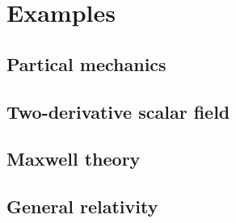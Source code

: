 \documentclass[10pt]{article}
\begin{document}
\section{Examples}
\subsection{Partical mechanics}

\subsection{Two-derivative scalar field}

\subsection{Maxwell theory}

\subsection{General relativity}

\clearpage


\end{document}
